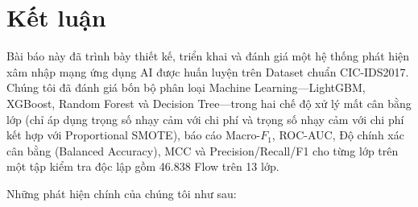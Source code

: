 \section{Kết luận}
\label{sec:conclusion}

Bài báo này đã trình bày thiết kế, triển khai và đánh giá một hệ thống phát hiện xâm nhập mạng ứng dụng AI được huấn luyện trên Dataset chuẩn CIC-IDS2017. Chúng tôi đã đánh giá bốn bộ phân loại Machine Learning---LightGBM, XGBoost, Random Forest và Decision Tree---trong hai chế độ xử lý mất cân bằng lớp (chỉ áp dụng trọng số nhạy cảm với chi phí và trọng số nhạy cảm với chi phí kết hợp với Proportional SMOTE), báo cáo Macro-$F_1$, ROC-AUC, Độ chính xác cân bằng (Balanced Accuracy), MCC và Precision/Recall/F1 cho từng lớp trên một tập kiểm tra độc lập gồm 46.838 Flow trên 13 lớp.

Những phát hiện chính của chúng tôi như sau:

